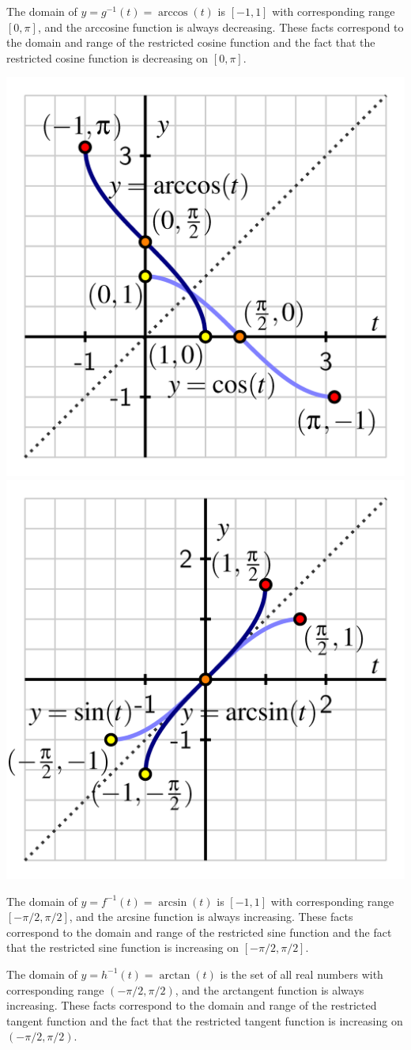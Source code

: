 \documentclass{ximera}
\begin{document}
\begin{summary}
\begin{itemize}
The domain of $y = g^{-1}(t) = \arccos(t)$ is $[-1,1]$ with corresponding range $[0,\pi]$, and the arccosine function is always decreasing.  These facts correspond to the domain and range of the restricted cosine function and the fact that the restricted cosine function is decreasing on $[0,\pi]$.
\begin{image}
\includegraphics[width = .49\linewidth]{inverse-trig-arccos-graph.png}
\includegraphics[width = .49\linewidth]{inverse-trig-arcsin-graph.png}
\end{image}
\par
The domain of $y = f^{-1}(t) = \arcsin(t)$ is $[-1,1]$ with corresponding range $[-\pi/2, \pi/2]$, and the arcsine function is always increasing.  These facts correspond to the domain and range of the restricted sine function and the fact that the restricted sine function is increasing on $[-\pi/2,\pi/2]$.%
\par
The domain of $y = h^{-1}(t) = \arctan(t)$ is the set of all real numbers with corresponding range $(-\pi/2, \pi/2)$, and the arctangent function is always increasing.  These facts correspond to the domain and range of the restricted tangent function and the fact that the restricted tangent function is increasing on $(-\pi/2,\pi/2)$.%
\begin{image}

\end{image}
\end{itemize}
\end{summary}
\end{document}
